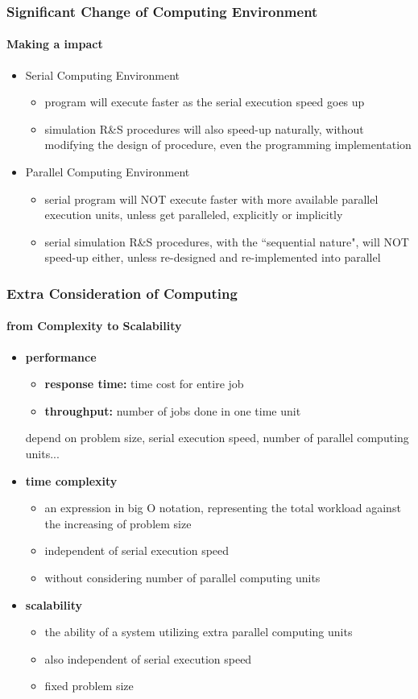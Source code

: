 \documentclass{beamer}
\begin{document}
\begin{frame}
\frametitle {Significant Change of Computing Environment}
\framesubtitle{Making a impact}
\begin{itemize}
\item Serial Computing Environment
\begin{itemize}
\item program will execute faster as the serial execution speed goes up
\item simulation R\&S procedures will also speed-up naturally, without modifying the design of procedure, even the programming implementation
\end{itemize}
\vspace{\baselineskip}
\item Parallel Computing Environment
\begin{itemize}
\item serial program will {\color{blue} NOT} execute faster with more available parallel execution units, unless get paralleled, explicitly or implicitly
\item serial simulation R\&S procedures, with the ``sequential nature", will {\color{blue} NOT} speed-up either, unless re-designed and re-implemented into parallel
\end{itemize}
\end{itemize}
\end{frame}

\begin{frame}
\frametitle{Extra Consideration of Computing}
\framesubtitle{from Complexity to Scalability}
\begin{itemize}
\item {\bf performance}
\begin{itemize}
\item {\bf response time:} time cost for entire job
\item {\bf throughput:} number of jobs done in one time unit
\end{itemize}
depend on problem size, serial execution speed, number of parallel computing units...
\item {\bf time complexity}
\begin{itemize}
\item an expression in big O notation, representing the total workload against the increasing of problem size
\item independent of serial execution speed
\item without considering number of parallel computing units
\end{itemize}
\item {\bf scalability}
\begin{itemize}
\item the ability of a system utilizing extra parallel computing units
\item also independent of serial execution speed
\item fixed problem size
\end{itemize}
\end{itemize}
\end{frame}
\end{document}
